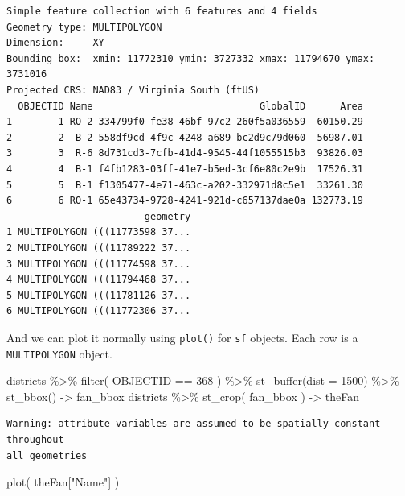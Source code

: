 \documentclass[
  letterpaper,
]{book}
\newenvironment{Shaded}{\begin{snugshade}}{\end{snugshade}}
\newcommand{\AttributeTok}[1]{\textcolor[rgb]{0.40,0.45,0.13}{#1}}
\newcommand{\DecValTok}[1]{\textcolor[rgb]{0.68,0.00,0.00}{#1}}
\newcommand{\FunctionTok}[1]{\textcolor[rgb]{0.28,0.35,0.67}{#1}}
\newcommand{\NormalTok}[1]{\textcolor[rgb]{0.00,0.23,0.31}{#1}}
\newcommand{\OtherTok}[1]{\textcolor[rgb]{0.00,0.23,0.31}{#1}}
\newcommand{\SpecialCharTok}[1]{\textcolor[rgb]{0.37,0.37,0.37}{#1}}
\newcommand{\StringTok}[1]{\textcolor[rgb]{0.13,0.47,0.30}{#1}}
\begin{document}
\begin{verbatim}
Simple feature collection with 6 features and 4 fields
Geometry type: MULTIPOLYGON
Dimension:     XY
Bounding box:  xmin: 11772310 ymin: 3727332 xmax: 11794670 ymax: 3731016
Projected CRS: NAD83 / Virginia South (ftUS)
  OBJECTID Name                             GlobalID      Area
1        1 RO-2 334799f0-fe38-46bf-97c2-260f5a036559  60150.29
2        2  B-2 558df9cd-4f9c-4248-a689-bc2d9c79d060  56987.01
3        3  R-6 8d731cd3-7cfb-41d4-9545-44f1055515b3  93826.03
4        4  B-1 f4fb1283-03ff-41e7-b5ed-3cf6e80c2e9b  17526.31
5        5  B-1 f1305477-4e71-463c-a202-332971d8c5e1  33261.30
6        6 RO-1 65e43734-9728-4241-921d-c657137dae0a 132773.19
                        geometry
1 MULTIPOLYGON (((11773598 37...
2 MULTIPOLYGON (((11789222 37...
3 MULTIPOLYGON (((11774598 37...
4 MULTIPOLYGON (((11794468 37...
5 MULTIPOLYGON (((11781126 37...
6 MULTIPOLYGON (((11772306 37...
\end{verbatim}

And we can plot it normally using \texttt{plot()} for \texttt{sf}
objects. Each row is a \texttt{MULTIPOLYGON} object.

\begin{Shaded}
\begin{Highlighting}[]
\NormalTok{districts }\SpecialCharTok{\%\textgreater{}\%}
  \FunctionTok{filter}\NormalTok{( OBJECTID }\SpecialCharTok{==} \DecValTok{368}\NormalTok{ ) }\SpecialCharTok{\%\textgreater{}\%}
  \FunctionTok{st\_buffer}\NormalTok{(}\AttributeTok{dist =} \DecValTok{1500}\NormalTok{) }\SpecialCharTok{\%\textgreater{}\%}
  \FunctionTok{st\_bbox}\NormalTok{() }\OtherTok{{-}\textgreater{}}\NormalTok{ fan\_bbox}
\NormalTok{districts }\SpecialCharTok{\%\textgreater{}\%}
  \FunctionTok{st\_crop}\NormalTok{( fan\_bbox ) }\OtherTok{{-}\textgreater{}}\NormalTok{ theFan }
\end{Highlighting}
\end{Shaded}

\begin{verbatim}
Warning: attribute variables are assumed to be spatially constant throughout
all geometries
\end{verbatim}

\begin{Shaded}
\begin{Highlighting}[]
\FunctionTok{plot}\NormalTok{( theFan[}\StringTok{"Name"}\NormalTok{] )}
\end{Highlighting}
\end{Shaded}
\end{document}
